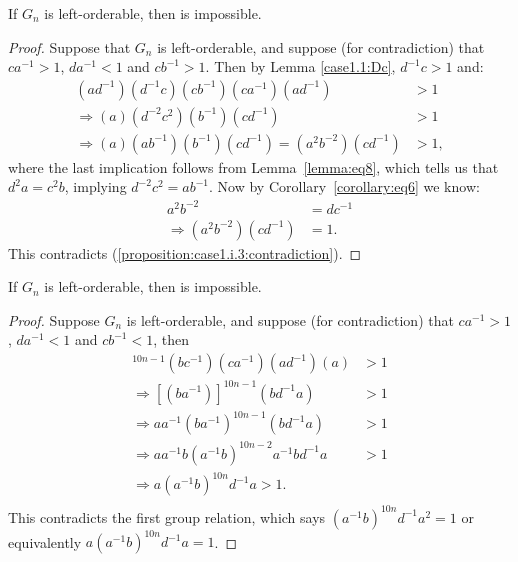 \begin{proposition} If $G_n$ is left-orderable, then  is impossible.
\end{proposition}
\begin{proof} Suppose that $G_n$ is left-orderable, and suppose (for contradiction) that $ca^{-1}>1$, $da^{-1}<1$ and $cb^{-1}>1$. Then by Lemma \ref{case1.1:Dc}, $d^{-1}c>1$ and:
\begin{align}
(ad^{-1})(d^{-1}c)(cb^{-1})(ca^{-1})(ad^{-1})&>1\nonumber{}\\
\Rightarrow{}(a)(d^{-2}c^{2})(b^{-1})(cd^{-1})&>1\nonumber{}\\
\Rightarrow{}(a)(ab^{-1})(b^{-1})(cd^{-1})=(a^{2}b^{-2})(cd^{-1})&>1,\label{proposition:case1.i.3:contradiction}
\end{align}
where the last implication follows from Lemma~\ref{lemma:eq8}, which tells us that $d^{2}a=c^{2}b$, implying $d^{-2}c^{2}=ab^{-1}$. Now by Corollary~\ref{corollary:eq6} we know:
\begin{align*}
a^{2}b^{-2}&=dc^{-1}\\
\Rightarrow{}(a^{2}b^{-2})(cd^{-1})&=1.
\end{align*}
This contradicts (\ref{proposition:case1.i.3:contradiction}).
\end{proof}

\begin{proposition} If $G_n$ is left-orderable, then  is impossible.
\end{proposition}
\begin{proof} Suppose $G_n$ is left-orderable, and suppose (for contradiction) that $ca^{-1}>1$, $da^{-1}<1$ and $cb^{-1}<1$, then
\begin{align*}
[(bc^{-1})(ca^{-1})]^{10n-1}(bc^{-1})(ca^{-1})(ad^{-1})(a)&>1\\
\Rightarrow{}[(ba^{-1})]^{10n-1}(bd^{-1}a)&>1\\
\Rightarrow{}aa^{-1}(ba^{-1})^{10n-1}(bd^{-1}a)&>1\\
\Rightarrow{}aa^{-1}b(a^{-1}b)^{10n-2}a^{-1}bd^{-1}a&>1\\
\Rightarrow{}a(a^{-1}b)^{10n}d^{-1}a>1.\\
\end{align*}
This contradicts the first group relation, which says $(a^{-1}b)^{10n}d^{-1}a^{2}=1$ or equivalently $a(a^{-1}b)^{10n}d^{-1}a=1$.
\end{proof}

